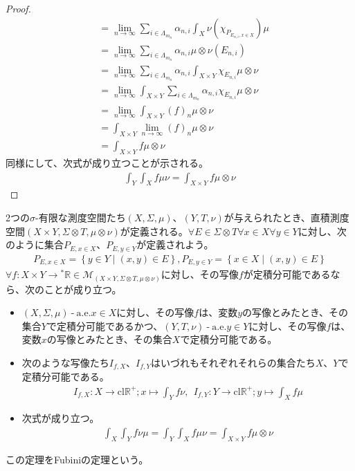 \documentclass[dvipdfmx]{jsarticle}
\begin{document}
\begin{proof}
\begin{align*}
&= \lim_{n \rightarrow \infty}{\sum_{i \in \varLambda_{m_{n}}} {\alpha_{n,i}\int_{X} {\nu\left( \chi_{P_{E_{n,i},x \in X}} \right)\mu}}}\\
&= \lim_{n \rightarrow \infty}{\sum_{i \in \varLambda_{m_{n}}} {\alpha_{n,i}\mu \otimes \nu\left( E_{n,i} \right)}}\\
&= \lim_{n \rightarrow \infty}{\sum_{i \in \varLambda_{m_{n}}} {\alpha_{n,i}\int_{X \times Y} {\chi_{E_{n,i}}\mu \otimes \nu}}}\\
&= \lim_{n \rightarrow \infty}{\int_{X \times Y} {\sum_{i \in \varLambda_{m_{n}}} {\alpha_{n,i}\chi_{E_{n,i}}}\mu \otimes \nu}}\\
&= \lim_{n \rightarrow \infty}{\int_{X \times Y} {(f)_{n}\mu \otimes \nu}}\\
&= \int_{X \times Y} {\lim_{n \rightarrow \infty}(f)_{n}\mu \otimes \nu}\\
&= \int_{X \times Y} {f\mu \otimes \nu}
\end{align*}
同様にして、次式が成り立つことが示される。
\begin{align*}
\int_{Y} {\int_{X} {f\mu}\nu} = \int_{X \times Y} {f\mu \otimes \nu}
\end{align*}
\end{proof}
\begin{thm}[Fubiniの定理]\label{4.6.4.4}
2つの$\sigma$-有限な測度空間たち$(X,\varSigma,\mu)$、$(Y,T,\nu)$が与えられたとき、直積測度空間$(X \times Y, \varSigma \otimes T, \mu \otimes \nu)$が定義される。$\forall E \in \varSigma \otimes T\forall x \in X\forall y \in Y$に対し、次のように集合$P_{E,x \in X}$、$P_{E,y \in Y}$が定義されよう。
\begin{align*}
P_{E,x \in X} = \left\{ y \in Y \middle| (x,y) \in E \right\}, P_{E,y \in Y} = \left\{ x \in X \middle| (x,y) \in E \right\}
\end{align*}
$\forall f:X \times Y \rightarrow{}^{*}\mathbb{R} \in \mathcal{M}_{(X \times Y, \varSigma \otimes T, \mu \otimes \nu)}$に対し、その写像$f$が定積分可能であるなら、次のことが成り立つ。
\begin{itemize}
\item
  $(X,\varSigma,\mu) \ \text{-} \ \mathrm{a.e.}x \in X$に対し、その写像$f$は、変数$y$の写像とみたとき、その集合$Y$で定積分可能であるかつ、$(Y,T,\nu) \ \text{-} \ \mathrm{a.e.}y \in Y$に対し、その写像$f$は、変数$x$の写像とみたとき、その集合$X$で定積分可能である。
\item
  次のような写像たち$I_{f,X}$、$I_{f,Y}$はいづれもそれぞれそれらの集合たち$X$、$Y$で定積分可能である。
\begin{align*}
I_{f,X}:X \rightarrow \mathrm{cl}\mathbb{R}^{+};x \mapsto \int_{Y} {f\nu},\ \ I_{f,Y}:Y \rightarrow \mathrm{cl}\mathbb{R}^{+};y \mapsto \int_{X} {f\mu}
\end{align*}
\item
  次式が成り立つ。
\begin{align*}
\int_{X} {\int_{Y} {f\nu}\mu} = \int_{Y} {\int_{X} {f\mu}\nu} = \int_{X \times Y} {f\mu \otimes \nu}
\end{align*}
\end{itemize}
この定理をFubiniの定理という。
\end{thm}
\end{document}
